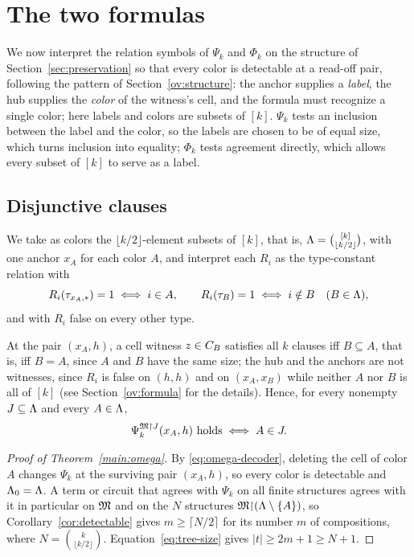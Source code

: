 \section{The two formulas}\label{sec:logical}
We now interpret the relation symbols of $\Psi_k$ and $\Phi_k$ on the
structure of Section~\ref{sec:preservation} so that every color is
detectable at a read-off pair, following the pattern of
Section~\ref{ov:structure}: the anchor supplies a \emph{label}, the hub
supplies the \emph{color} of the witness's cell, and the formula must
recognize a single color; here labels and colors are subsets of $[k]$.
$\Psi_k$ tests an inclusion between the label and the color, so the labels
are chosen to be of equal size, which turns inclusion into equality;
$\Phi_k$ tests agreement directly, which allows every subset of $[k]$ to
serve as a label.

\subsection{Disjunctive clauses}\label{sec:psi}
We take as colors the $\lfloor k/2\rfloor$-element subsets of $[k]$, that
is, $\Lambda=\binom{[k]}{\lfloor k/2\rfloor}$, with one anchor $x_A$ for each
color $A$, and interpret each $R_i$ as the type-constant relation with
\begin{equation}\label{eq:omega-inputs}
 R_i(\tau_{x_A,\ast})=1\iff i\in A,\qquad
 R_i(\tau_{B})=1\iff i\notin B\quad(B\in\Lambda),
\end{equation}
and with $R_i$ false on every other type.

At the pair $(x_A,h)$, a cell witness $z\in C_{B}$ satisfies all $k$
clauses iff $B\subseteq A$, that is, iff $B=A$, since $A$ and $B$ have the
same size; the hub and the anchors are not witnesses, since $R_i$ is false
on $(h,h)$ and on $(x_A,x_B)$ while neither $A$ nor $B$ is all of $[k]$
(see Section~\ref{ov:formula} for the details). Hence, for every nonempty
$J\subseteq\Lambda$ and every $A\in\Lambda$,
\begin{equation}\label{eq:omega-decoder}
 \Psi_k^{\mathfrak M\mathord{\restriction} J}(x_A,h)\ \text{holds}\iff A\in J.
\end{equation}

\begin{proof}[Proof of Theorem~\ref{main:omega}]
By \eqref{eq:omega-decoder}, deleting the cell of color $A$ changes $\Psi_k$
at the surviving pair $(x_A,h)$, so every color is detectable and
$\Lambda_0=\Lambda$. A term or circuit that agrees with $\Psi_k$ on all finite
structures agrees with it in particular on $\mathfrak M$ and on the $N$ structures
$\mathfrak M\mathord{\restriction}(\Lambda\setminus\{A\})$, so Corollary~\ref{cor:detectable} gives
$m\ge\lceil N/2\rceil$ for its number $m$ of compositions, where
$N=\binom{k}{\lfloor k/2\rfloor}$. Equation~\eqref{eq:tree-size} gives
$|t|\ge2m+1\ge N+1$.
\end{proof}

